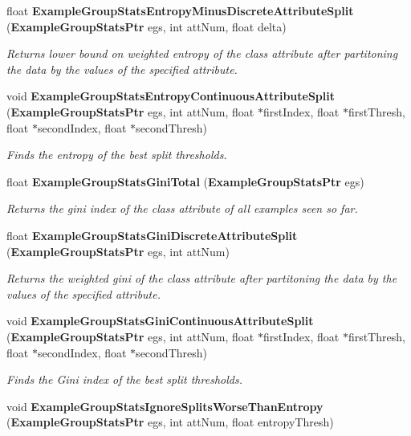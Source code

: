 \begin{CompactItemize}
float {\bf Example\-Group\-Stats\-Entropy\-Minus\-Discrete\-Attribute\-Split} ({\bf Example\-Group\-Stats\-Ptr} egs, int att\-Num, float delta)
\begin{CompactList}\small\item\em Returns lower bound on weighted entropy of the class attribute after partitoning the data by the values of the specified attribute. \item\end{CompactList}\item 
void {\bf Example\-Group\-Stats\-Entropy\-Continuous\-Attribute\-Split} ({\bf Example\-Group\-Stats\-Ptr} egs, int att\-Num, float $\ast$first\-Index, float $\ast$first\-Thresh, float $\ast$second\-Index, float $\ast$second\-Thresh)
\begin{CompactList}\small\item\em Finds the entropy of the best split thresholds. \item\end{CompactList}\item 
float {\bf Example\-Group\-Stats\-Gini\-Total} ({\bf Example\-Group\-Stats\-Ptr} egs)
\begin{CompactList}\small\item\em Returns the gini index of the class attribute of all examples seen so far. \item\end{CompactList}\item 
float {\bf Example\-Group\-Stats\-Gini\-Discrete\-Attribute\-Split} ({\bf Example\-Group\-Stats\-Ptr} egs, int att\-Num)
\begin{CompactList}\small\item\em Returns the weighted gini of the class attribute after partitoning the data by the values of the specified attribute. \item\end{CompactList}\item 
void {\bf Example\-Group\-Stats\-Gini\-Continuous\-Attribute\-Split} ({\bf Example\-Group\-Stats\-Ptr} egs, int att\-Num, float $\ast$first\-Index, float $\ast$first\-Thresh, float $\ast$second\-Index, float $\ast$second\-Thresh)
\begin{CompactList}\small\item\em Finds the Gini index of the best split thresholds. \item\end{CompactList}\item 
void {\bf Example\-Group\-Stats\-Ignore\-Splits\-Worse\-Than\-Entropy} ({\bf Example\-Group\-Stats\-Ptr} egs, int att\-Num, float entropy\-Thresh)

\end{CompactItemize}
